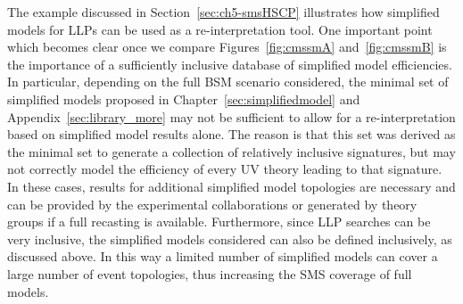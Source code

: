 The example discussed in Section~\ref{sec:ch5-smsHSCP} illustrates how simplified
models for LLPs can be used as a re-interpretation tool. One important
point which becomes clear once we compare Figures~\ref{fig:cmssmA} and~\ref{fig:cmssmB} 
is the importance of a sufficiently inclusive database of simplified 
model efficiencies. In particular, depending on the full BSM scenario considered,
the minimal set of simplified models proposed in Chapter~\ref{sec:simplifiedmodel} and 
Appendix~\ref{sec:library_more} may not be sufficient to allow for a re-interpretation 
based on simplified model results alone. The reason is that this set was derived as the minimal
set to generate a collection of relatively inclusive signatures, but may not correctly model
the efficiency of every UV theory leading to that signature. In these cases, results for additional simplified 
model topologies are necessary and can be provided by the experimental collaborations or 
generated by theory groups if a full recasting is available.
Furthermore, since LLP searches can be very inclusive,
the simplified models considered can also be defined inclusively,
as discussed above. In this way a limited number of simplified models
can cover a large number of event topologies, thus increasing the
SMS coverage of full models.


